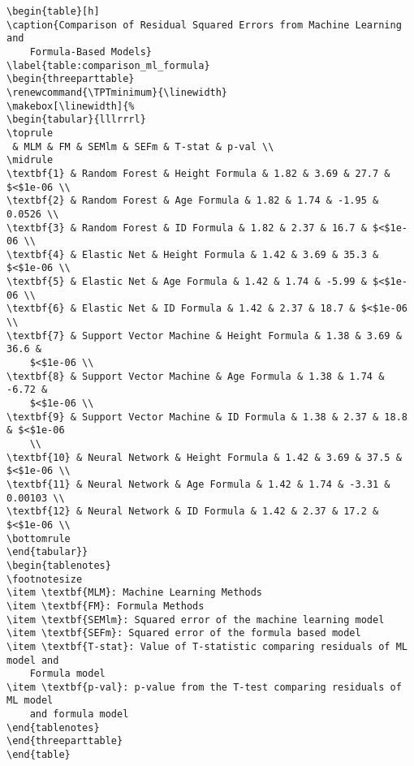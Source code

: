 \documentclass[11pt]{article}
\begin{document}
\begin{Verbatim}[tabsize=4]
\begin{table}[h]
\caption{Comparison of Residual Squared Errors from Machine Learning and
	Formula-Based Models}
\label{table:comparison_ml_formula}
\begin{threeparttable}
\renewcommand{\TPTminimum}{\linewidth}
\makebox[\linewidth]{%
\begin{tabular}{lllrrrl}
\toprule
 & MLM & FM & SEMlm & SEFm & T-stat & p-val \\
\midrule
\textbf{1} & Random Forest & Height Formula & 1.82 & 3.69 & 27.7 & $<$1e-06 \\
\textbf{2} & Random Forest & Age Formula & 1.82 & 1.74 & -1.95 & 0.0526 \\
\textbf{3} & Random Forest & ID Formula & 1.82 & 2.37 & 16.7 & $<$1e-06 \\
\textbf{4} & Elastic Net & Height Formula & 1.42 & 3.69 & 35.3 & $<$1e-06 \\
\textbf{5} & Elastic Net & Age Formula & 1.42 & 1.74 & -5.99 & $<$1e-06 \\
\textbf{6} & Elastic Net & ID Formula & 1.42 & 2.37 & 18.7 & $<$1e-06 \\
\textbf{7} & Support Vector Machine & Height Formula & 1.38 & 3.69 & 36.6 &
	$<$1e-06 \\
\textbf{8} & Support Vector Machine & Age Formula & 1.38 & 1.74 & -6.72 &
	$<$1e-06 \\
\textbf{9} & Support Vector Machine & ID Formula & 1.38 & 2.37 & 18.8 & $<$1e-06
	\\
\textbf{10} & Neural Network & Height Formula & 1.42 & 3.69 & 37.5 & $<$1e-06 \\
\textbf{11} & Neural Network & Age Formula & 1.42 & 1.74 & -3.31 & 0.00103 \\
\textbf{12} & Neural Network & ID Formula & 1.42 & 2.37 & 17.2 & $<$1e-06 \\
\bottomrule
\end{tabular}}
\begin{tablenotes}
\footnotesize
\item \textbf{MLM}: Machine Learning Methods
\item \textbf{FM}: Formula Methods
\item \textbf{SEMlm}: Squared error of the machine learning model
\item \textbf{SEFm}: Squared error of the formula based model
\item \textbf{T-stat}: Value of T-statistic comparing residuals of ML model and
	Formula model
\item \textbf{p-val}: p-value from the T-test comparing residuals of ML model
	and formula model
\end{tablenotes}
\end{threeparttable}
\end{table}

\end{Verbatim}




\end{document}
